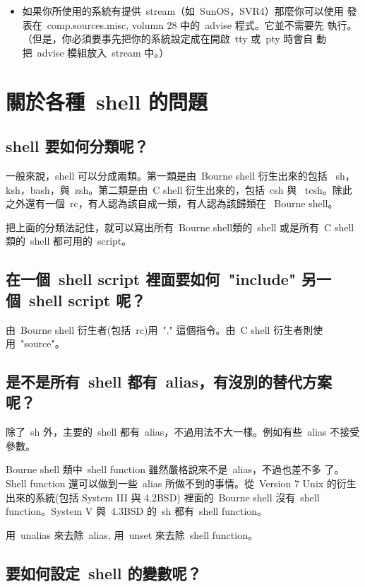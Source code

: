 \documentclass{article}
\begin{document}
\begin{CJK*}{Bg5}{ming}
\begin{itemize}
	\item  如果你所使用的系統有提供~stream（如~SunOS，SVR4）那麼你可以使用
	   發表在~comp.sources.misc, volumn 28 中的~advise 程式。它並不需要先
           執行。（但是，你必須要事先把你的系統設定成在開啟~tty 或~pty 時會自
           動把~advise 模組放入~stream 中。）
\end{itemize}

\section{關於各種~shell 的問題}
\subsection{shell 要如何分類呢？}

	一般來說，shell 可以分成兩類。第一類是由~Bourne shell 衍生出來的包括 
	~sh，ksh，bash，與~zsh。第二類是由~C shell 衍生出來的，包括~csh 與 
	~tcsh。除此之外還有一個~rc，有人認為該自成一類，有人認為該歸類在 
	~Bourne shell。

	把上面的分類法記住，就可以寫出所有~Bourne shell類的~shell 或是所有~C 
	shell 類的~shell 都可用的~script。

\subsection{在一個~shell script 裡面要如何~"include" 另一個~shell script 呢？}

	由~Bourne shell 衍生者(包括~rc)用~"." 這個指令。由~C shell 衍生者則使
        用~"source"。

\subsection{是不是所有~shell 都有~alias，有沒別的替代方案呢？ }

	除了~sh 外，主要的~shell 都有~alias，不過用法不大一樣。例如有些~alias 
        不接受參數。

	Bourne shell 類中~shell function 雖然嚴格說來不是~alias，不過也差不多
	了。Shell function 還可以做到一些~alias 所做不到的事情。從~Version 7 
	Unix 的衍生出來的系統(包括 System III 與 4.2BSD) 裡面的~Bourne shell 
	沒有~shell function。System V 與~4.3BSD 的~sh 都有~shell function。

	用~unalias 來去除~alias, 用~unset 來去除~shell function。

\subsection{要如何設定~shell 的變數呢？}


\end{CJK*}
\end{document}
